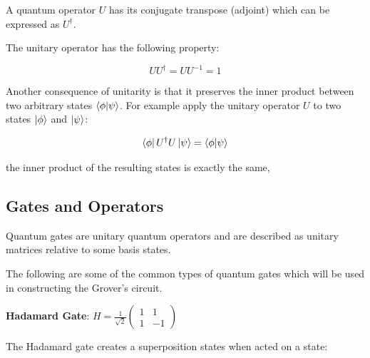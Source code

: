 \documentclass{article}
\begin{document}
\noindent
A quantum operator $U$ has its conjugate transpose (adjoint) which can be expressed as $U^{\dagger}$.
\vspace{5mm}

\noindent
The unitary operator has the following property\cite{noauthor_unitary_2022}:
\vspace{5mm}

\begin{equation}
UU^{\dagger} = UU^{-1} = 1    
\end{equation}
\vspace{5mm}

\noindent
Another consequence of unitarity is that it preserves the inner product between two arbitrary states $\braket{\phi}{\psi}$. For example apply the unitary operator $U$ to two states $\ket{\phi}$ and $\ket{\psi}$:
\vspace{5mm}

\begin{equation}
\bra{\phi} U^{\dagger} U\ket{\psi} = \braket{\phi}{\psi}
\end{equation}
\vspace{5mm}

\noindent
the inner product of the resulting states is exactly the same,
\vspace{10mm}


\subsection{Gates and Operators}
\vspace{5mm}

Quantum gates are unitary quantum operators and are described as unitary matrices relative to some basis states.
\vspace{5mm}

\noindent
The following are some of the common types of quantum gates\cite{voorhoede_pauli-x_nodate} which will be used in constructing the Grover's circuit.
\vspace{5mm}

\textbf{Hadamard Gate}: \qquad $H = \frac{1}{\sqrt{2}} \begin{pmatrix} 1 & 1 \\ 1 & -1 \end{pmatrix}$
\vspace{5mm}

\noindent
The Hadamard gate creates a superposition states when acted on a state:
\vspace{5mm}
\end{document}
